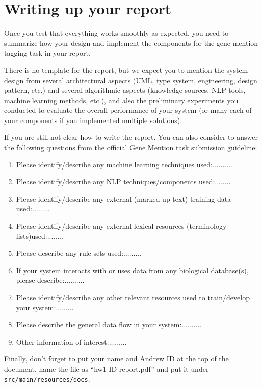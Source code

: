 
\section{Writing up your report}

Once you test that everything works smoothly as expected, you need to summarize
how your design and implement the components for the gene mention tagging task
in your report.

There is no template for the report, but we expect you to mention the system
design from several architectural aspects (UML, type system, engineering, design
pattern, etc.) and several algorithmic aspects (knowledge sources, NLP tools,
machine learning methods, etc.), and also the preliminary experiments you
conducted to evaluate the overall performance of your system (or many each of
your components if you implemented multiple solutions).

If you are still not clear how to write the report. You can also consider to
answer the following questions from the official Gene Mention task submission
guideline:

\begin{enumerate}
\item Please identify/describe any machine learning techniques used:.......... 
\item Please identify/describe any NLP techniques/components used:........ 
\item Please identify/describe any external (marked up text) training data used:......... 
\item Please identify/describe any external lexical resources (terminology lists)used:........ 
\item Please describe any rule sets used:......... 
\item If your system interacts with or uses data from any biological database(s), please describe:.......... 
\item Please identify/describe any other relevant resources used to train/develop your system:......... 
\item Please describe the general data flow in your system:.......... 
\item Other information of interest:.........
\end{enumerate}

Finally, don't forget to put your name and Andrew ID at the top of the document,
name the file as ``hw1-ID-report.pdf'' and put it under
\texttt{src/main/resources/docs}.
